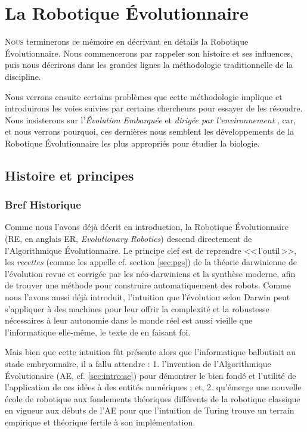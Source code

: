
\chapter{La Robotique \'Evolutionnaire}\label{ch:RE}

\lettrine[lines=2]{N}{ous} terminerons ce mémoire en décrivant en détails la Robotique \'Evolutionnaire. Nous commencerons par rappeler son histoire et ses influences, puis nous décrirons dans les grandes lignes la méthodologie traditionnelle de la discipline.

Nous verrons ensuite certains problèmes que cette méthodologie implique et introduirons les voies suivies par certains chercheurs pour essayer de les résoudre. Nous insisterons sur l'\emph{\'Evolution Embarquée} \citep{watson02embodiedevolutiondistributingevolutionaryalgorithmpopulationrobots} et \emph{dirigée par l'environnement} \citep{bredeche2012environmentdrivendistributedevolutionaryadaptation}, car, et nous verrons pourquoi, ces dernières nous semblent les développements de la Robotique \'Evolutionnaire les plus appropriés pour étudier la biologie.

\section{Histoire et principes}\label{sec:re}
\subsection{Bref Historique}
\label{sec:re:hist}


Comme nous l'avons déjà décrit en introduction, la Robotique \'Evolutionnaire (RE, en anglais ER, \emph{Evolutionary Robotics}) descend directement de l'Algorithmique Évolutionnaire. Le principe clef est de reprendre <<\,l'outil\,>>, les \emph{recettes} (comme les appelle \cite{godfrey2009darwinian} cf. section \ref{sec:pgs}) de la théorie darwinienne de l'évolution revue et corrigée par les néo-darwiniens et la synthèse moderne, afin de trouver une méthode pour construire automatiquement des robots.
Comme nous l'avons aussi déjà introduit, l'intuition que l'évolution selon Darwin peut s'appliquer à des machines pour leur offrir la complexité et la robustesse nécessaires à leur autonomie dans le monde réel est aussi vieille que l'informatique elle-même, le texte de \cite{turing50computingmachineryintelligence} en faisant foi.

Mais bien que cette intuition fût présente alors que l'informatique balbutiait au stade embryonnaire, il a fallu attendre : 1. l'invention de l'Algorithmique \'Evolutionaire (AE, cf. \ref{sec:intro:ae}) pour démontrer le bien fondé et l'utilité de l'application de ces idées à des entités numériques ; et, 2. qu'émerge une nouvelle école de robotique aux fondements théoriques différents de la robotique classique en vigueur aux débuts de l'AE pour que l'intuition de Turing trouve un terrain empirique et théorique fertile à son implémentation.

